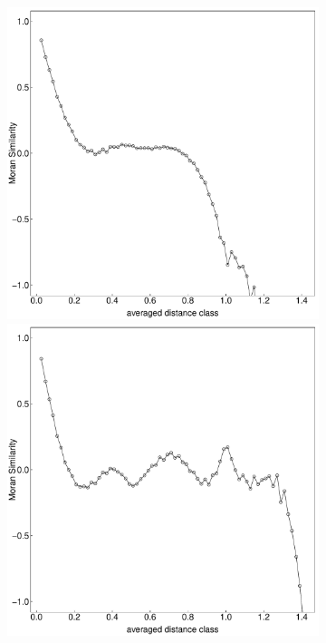 \documentclass{article}
\begin{document}
\begin{figure}
\begin{subfigure}{0.3\textwidth}
		\includegraphics[width=\linewidth]{figures/correlog112}\\
		\includegraphics[width=\linewidth]{figures/correlog113}\\

\end{subfigure}
\end{figure}
\end{document}
